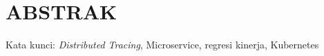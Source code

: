 \clearpage
\chapter*{ABSTRAK}



\vspace{15mm}
Kata kunci: \textit{Distributed Tracing}, Microservice, regresi kinerja, Kubernetes
\clearpage